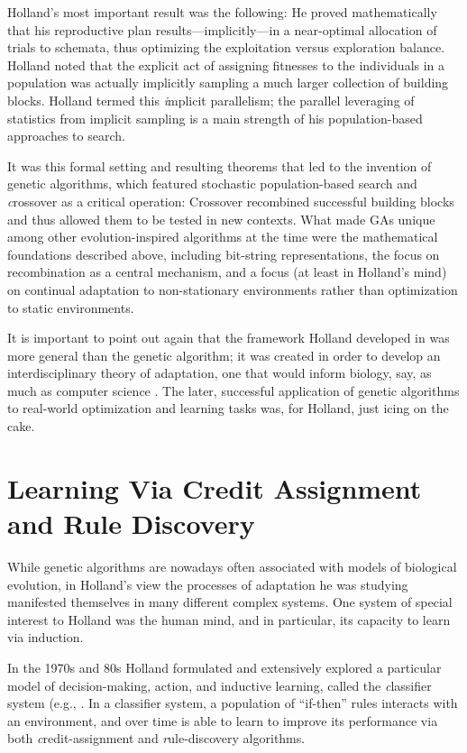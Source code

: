 \documentclass{sig-alternate}
\begin{document}
Holland's most important result was the following: He proved
mathematically that his reproductive plan results---implicitly---in a
near-optimal allocation of trials to schemata, thus optimizing the
exploitation versus exploration balance.  Holland noted that the
explicit act of assigning fitnesses to the individuals in a population
was actually implicitly sampling a much larger collection of building
blocks.  Holland termed this {\emph implicit parallelism}; the
parallel leveraging of statistics from implicit sampling is a main
strength of his population-based approaches to search.

It was this formal setting and resulting theorems that led to the
invention of genetic algorithms, which featured stochastic
population-based search and {\emph crossover} as a critical
operation: Crossover recombined successful building blocks and
thus allowed them to be tested in new contexts.  What made GAs unique
among other evolution-inspired algorithms at the time were the
mathematical foundations described above, including bit-string
representations, the focus on recombination as a central mechanism,
and a focus (at least in Holland's mind) on continual adaptation to
non-stationary environments rather than optimization to static
environments.

It is important to point out again that the framework Holland
developed in \cite{ANAS} was more general than the genetic algorithm;
it was created in order to develop an interdisciplinary theory of
adaptation, one that would inform biology, say, as much as computer
science \cite{ChristiansenFeldmanPaper}.  The later, successful
application of genetic algorithms to real-world optimization and
learning tasks was, for Holland, just icing on the cake.

\section{Learning Via Credit Assignment and Rule Discovery}

While genetic algorithms are nowadays often associated with models of
biological evolution, in Holland's view the processes of adaptation he
was studying manifested themselves in many different complex systems.
One system of special interest to Holland was the human mind, and in
particular, its capacity to learn via induction.

In the 1970s and 80s Holland formulated and extensively explored a
particular model of decision-making, action, and inductive learning,
called the {\emph classifier system}
(e.g., \cite{Holland&Reitman1978,EscapingBrittlenessPaper}.  In a
classifier system, a population of ``if-then'' rules interacts with an
environment, and over time is able to learn to improve its performance
via both {\emph credit-assignment} and {\emph rule-discovery}
algorithms.
\end{document}
